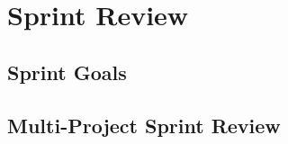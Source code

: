 \chapter{Sprint Review}\label{chap:sprint4_end}

\section{Sprint Goals}\label{sec:s4_goals}

\section{Multi-Project Sprint Review}\label{sec:s4_multiprj_review}